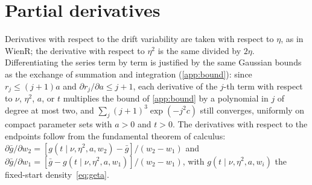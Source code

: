 \documentclass[final,5p,times,twocolumn,authoryear]{elsarticle}
\newcommand{\gbar}{\bar{g}}
\begin{document}
\section{Partial derivatives}
\label{app:grad}
Derivatives with respect to the drift variability are taken with respect to $\eta$, as in WienR; the derivative with respect to $\eta^2$ is the same divided by $2\eta$. Differentiating the series term by term is justified by the same Gaussian bounds as the exchange of summation and integration (\ref{app:bound}): since $r_j \le (j+1)a$ and $\partial r_j/\partial a \le j+1$, each derivative of the $j$-th term with respect to $\nu$, $\eta^2$, $a$, or $t$ multiplies the bound of \ref{app:bound} by a polynomial in $j$ of degree at most two, and $\sum_j (j+1)^3\exp(-j^2 c)$ still converges, uniformly on compact parameter sets with $a > 0$ and $t > 0$. The derivatives with respect to the endpoints follow from the fundamental theorem of calculus: $\partial\gbar/\partial w_2 = [g(t \mid \nu, \eta^2, a, w_2) - \gbar]/(w_2 - w_1)$ and $\partial\gbar/\partial w_1 = [\gbar - g(t \mid \nu, \eta^2, a, w_1)]/(w_2 - w_1)$, with $g(t \mid \nu, \eta^2, a, w_i)$ the fixed-start density~\eqref{eq:geta}.
\end{document}
